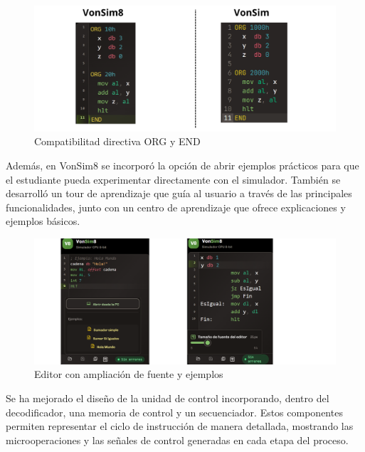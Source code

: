 \documentclass[12pt,oneside]{templates/unerthesis}
\begin{document}
\begin{figure}

{\centering \includegraphics[width=1\linewidth]{images/org} 

}

\caption{Compatibilitad directiva ORG y END}\label{fig:org}
\end{figure}

Además, en VonSim8 se incorporó la opción de abrir ejemplos prácticos para que el estudiante pueda experimentar directamente con el simulador. También se desarrolló un tour de aprendizaje que guía al usuario a través de las principales funcionalidades, junto con un centro de aprendizaje que ofrece explicaciones y ejemplos básicos.

\begin{figure}

{\centering \includegraphics[width=1\linewidth]{images/editorfuenteejemplo} 

}

\caption{Editor con ampliación de fuente y ejemplos}\label{fig:editorvonsim}
\end{figure}

Se ha mejorado el diseño de la unidad de control incorporando, dentro del decodificador, una memoria de control y un secuenciador. Estos componentes permiten representar el ciclo de instrucción de manera detallada, mostrando las microoperaciones y las señales de control generadas en cada etapa del proceso.
\end{document}
